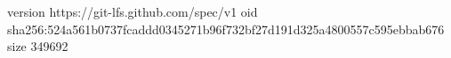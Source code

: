 version https://git-lfs.github.com/spec/v1
oid sha256:524a561b0737fcaddd0345271b96f732bf27d191d325a4800557c595ebbab676
size 349692
